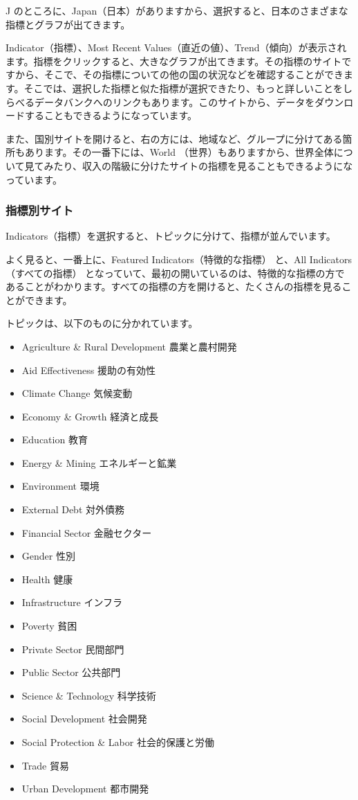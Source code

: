 \documentclass[
  xelatex, ja=standard]{bxjsbook}
\providecommand{\tightlist}{%
  \setlength{\itemsep}{0pt}\setlength{\parskip}{0pt}}
\theoremstyle{definition}
\theoremstyle{definition}
\theoremstyle{definition}
\theoremstyle{definition}
\theoremstyle{remark}
\begin{document}
J のところに、Japan（日本）がありますから、選択すると、日本のさまざまな指標とグラフが出てきます。

Indicator（指標）、Most Recent Values（直近の値）、Trend（傾向）が表示されます。指標をクリックすると、大きなグラフが出てきます。その指標のサイトですから、そこで、その指標についての他の国の状況などを確認することができます。そこでは、選択した指標と似た指標が選択できたり、もっと詳しいことをしらべるデータバンクへのリンクもあります。このサイトから、データをダウンロードすることもできるようになっています。

また、国別サイトを開けると、右の方には、地域など、グループに分けてある箇所もあります。その一番下には、World （世界）もありますから、世界全体について見てみたり、収入の階級に分けたサイトの指標を見ることもできるようになっています。

\hypertarget{ux6307ux6a19ux5225ux30b5ux30a4ux30c8}{%
\subsubsection{指標別サイト}\label{ux6307ux6a19ux5225ux30b5ux30a4ux30c8}}

Indicators（指標）を選択すると、トピックに分けて、指標が並んでいます。

よく見ると、一番上に、Featured Indicators（特徴的な指標） と、All Indicators（すべての指標） となっていて、最初の開いているのは、特徴的な指標の方であることがわかります。すべての指標の方を開けると、たくさんの指標を見ることができます。

トピックは、以下のものに分かれています。

\begin{itemize}
\tightlist
\item
  Agriculture \& Rural Development 農業と農村開発
\item
  Aid Effectiveness 援助の有効性
\item
  Climate Change 気候変動
\item
  Economy \& Growth 経済と成長
\item
  Education 教育
\item
  Energy \& Mining エネルギーと鉱業
\item
  Environment 環境
\item
  External Debt 対外債務
\item
  Financial Sector 金融セクター
\item
  Gender 性別
\item
  Health 健康
\item
  Infrastructure インフラ
\item
  Poverty 貧困
\item
  Private Sector 民間部門
\item
  Public Sector 公共部門
\item
  Science \& Technology 科学技術
\item
  Social Development 社会開発
\item
  Social Protection \& Labor 社会的保護と労働
\item
  Trade 貿易
\item
  Urban Development 都市開発
\end{itemize}
\end{document}
